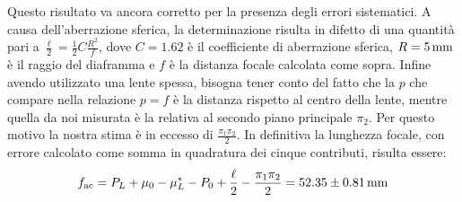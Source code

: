 \documentclass[italian,a4paper]{article}
\begin{document}
Questo risultato va ancora corretto per la presenza degli errori sistematici. A causa dell'aberrazione sferica, la determinazione risulta in difetto di una quantità pari a $\frac{\ell}{2}=\frac{1}{2}C\frac{R^2}{f}$, dove $C=1.62$ è il coefficiente di aberrazione sferica, $R=\unit[5]{mm}$ è il raggio del diaframma e $f$ è la distanza focale calcolata come sopra. Infine avendo utilizzato una lente spessa, bisogna tener conto del fatto che la $p$ che compare nella relazione $p=f$ è la distanza rispetto al centro della lente, mentre quella da noi misurata è la relativa al secondo piano principale $\pi_2$. Per questo motivo la nostra stima è in eccesso di $\frac{\pi_1\pi_2}{2}$. In definitiva la lunghezza focale, con errore calcolato come somma in quadratura dei cinque contributi, risulta essere:
$$f_{\text{ac}}=P_L+\mu_0-\mu_L^*-P_0+\dfrac{\ell}{2}-\dfrac{\pi_1\pi_2}{2}= \unit[52.35 \pm 0.81]{mm}$$
\end{document}
